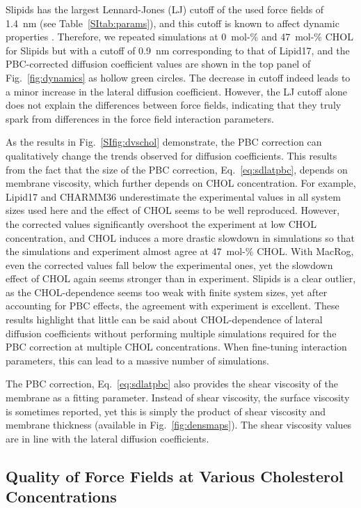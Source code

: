 \documentclass[journal=jctcce]{achemso}
\begin{document}
Slipids has the largest Lennard-Jones (LJ) cutoff of the used force fields of 1.4~nm (see Table~\ref{SItab:params}), and this cutoff is known to affect dynamic properties \cite{leonard2018comparison}. Therefore, we repeated simulations at 0~mol-\% and 47~mol-\% CHOL for Slipids but with a cutoff of 0.9~nm corresponding to that of Lipid17, and the PBC-corrected diffusion coefficient values are shown in the top panel of Fig.~\ref{fig:dynamics} as hollow green circles. The decrease in cutoff indeed leads to a minor increase in the lateral diffusion coefficient. However, the LJ cutoff alone does not explain the differences between force fields, indicating that they truly spark from differences in the force field interaction parameters.

As the results in Fig.~\ref{SIfig:dvschol} demonstrate, the PBC correction can qualitatively change the trends observed for diffusion coefficients. This results from the fact that the size of the PBC correction, Eq.~\eqref{eq:sdlatpbc}, depends on membrane viscosity, which further depends on CHOL concentration. For example, Lipid17 and CHARMM36 underestimate the experimental values in all system sizes used here and the effect of CHOL seems to be well reproduced. However, the corrected values significantly overshoot the experiment at low CHOL concentration, and CHOL induces a more drastic slowdown in simulations so that the simulations and experiment almost agree at 47~mol-\% CHOL. With MacRog, even the corrected values fall below the experimental ones, yet the slowdown effect of CHOL again seems stronger than in experiment. Slipids is a clear outlier, as the CHOL-dependence seems too weak with finite system sizes, yet after accounting for PBC effects, the agreement with experiment is excellent. These results highlight that little can be said about CHOL-dependence of lateral diffusion coefficients without performing multiple simulations required for the PBC correction at multiple CHOL concentrations. When fine-tuning interaction parameters, this can lead to a massive number of simulations.

The PBC correction, Eq.~\eqref{eq:sdlatpbc} also provides the shear viscosity of the membrane as a fitting parameter. Instead of shear viscosity, the surface viscosity is sometimes reported, yet this is simply the product of shear viscosity and membrane thickness (available in Fig.~\ref{fig:densmaps}). The shear viscosity values are in line with the lateral diffusion coefficients. 


\subsection{Quality of Force Fields at Various Cholesterol Concentrations}
\end{document}
